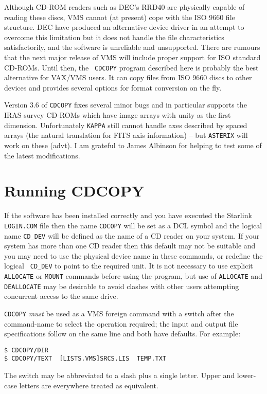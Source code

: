 Although CD-ROM readers such as DEC's RRD40 are physically capable of
reading these discs, VMS cannot (at present) cope with the ISO 9660 file
structure. DEC have produced an alternative device driver in an attempt
to overcome this limitation but it does not handle the file
characteristics satisfactorily, and the software is unreliable and
unsupported. There are rumours that the next major release of VMS will
include proper support for ISO standard CD-ROMs. Until then, the {\tt
CDCOPY} program described here is probably the best alternative for
VAX/VMS users. It can copy files from ISO 9660 discs to other devices
and provides several options for format conversion on the fly.

Version 3.6 of {\tt CDCOPY} fixes several minor bugs and in particular
supports the IRAS survey CD-ROMs which have image arrays with unity as
the first dimension. Unfortunately {\tt KAPPA} still cannot handle axes
described by spaced arrays (the natural translation for FITS axis
information) -- but {\tt ASTERIX} will work on these (advt).
I am grateful to James Albinson for helping to test some of the latest
modifications.

\section{Running CDCOPY}

If the software has been installed correctly and you have executed the
Starlink {\tt LOGIN.COM} file then the name {\tt CDCOPY} will be set as
a DCL symbol and the logical name {\tt CD\_DEV} will be defined as the
name of a CD reader on your system. If your system has more than one CD
reader then this default may not be suitable and you may need to use the
physical device name in these commands, or redefine the logical {\tt
CD\_DEV} to point to the required unit.  It is not necessary to use
explicit {\tt ALLOCATE} or {\tt MOUNT} commands before using the
program, but use of {\tt ALLOCATE} and {\tt DEALLOCATE} may be desirable
to avoid clashes with other users attempting concurrent access to the
same drive.

{\tt CDCOPY} {\em must} be used as a VMS foreign command with a switch
after the command-name to select the operation required; the input and
output file specifications follow on the same line and both have
defaults.  For example:
\begin{verbatim}
$ CDCOPY/DIR
$ CDCOPY/TEXT  [LISTS.VMS]SRCS.LIS  TEMP.TXT
\end{verbatim}
The switch may be abbreviated to a slash plus a single letter. Upper and
lower-case letters are everywhere treated as equivalent.

